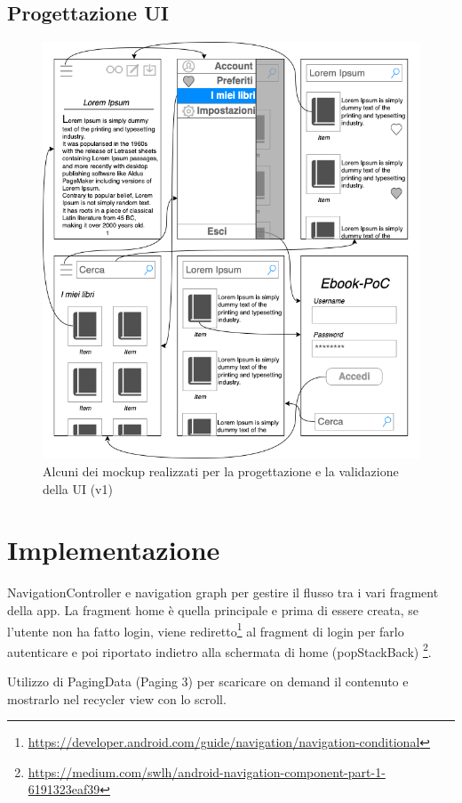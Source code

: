 \subsection{Progettazione UI}
\begin{figure}[H]
\centering
\includegraphics[width=1\textwidth]{img/tesi-14-mockup1.drawio.png}
\caption{Alcuni dei mockup realizzati per la progettazione e la validazione della UI (v1)}
\end{figure}

\section{Implementazione}

NavigationController e navigation graph per gestire il flusso tra i vari fragment della app. La fragment home è quella principale e prima di essere creata, se l'utente non ha fatto login, viene rediretto\footnote{\url{https://developer.android.com/guide/navigation/navigation-conditional}} al fragment di login per farlo autenticare e poi riportato indietro alla schermata di home (popStackBack)
\footnote{\url{https://medium.com/swlh/android-navigation-component-part-1-6191323eaf39}}.

Utilizzo di PagingData (Paging 3) per scaricare on demand il contenuto e mostrarlo nel recycler view con lo scroll.